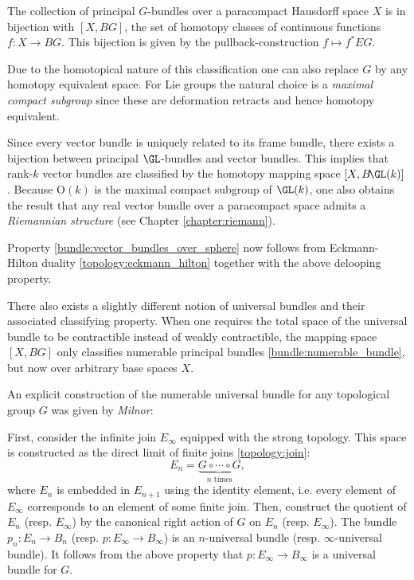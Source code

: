     \begin{property}[Classification]\label{bundle:classification}
        The collection of principal $G$-bundles over a paracompact Hausdorff space $X$ is in bijection with $[X,BG]$, the set of homotopy classes of continuous functions $f:X\rightarrow BG$. This bijection is given by the pullback-construction $f\mapsto f^*EG$.

        Due to the homotopical nature of this classification one can also replace $G$ by any homotopy equivalent space. For Lie groups the natural choice is a \textit{maximal compact subgroup} since these are deformation retracts and hence homotopy equivalent.
    \end{property}
    \begin{result}
        Since every vector bundle is uniquely related to its frame bundle, there exists a bijection between principal $\GL$-bundles and vector bundles. This implies that rank-$k$ vector bundles are classified by the homotopy mapping space $[X,B\!\GL(k)]$. Because $\mathrm{O}(k)$ is the maximal compact subgroup of $\GL(k)$, one also obtains the result that any real vector bundle over a paracompact space admits a \textit{Riemannian structure} (see Chapter \ref{chapter:riemann}).

        Property \ref{bundle:vector_bundles_over_sphere} now follows from Eckmann-Hilton duality \ref{topology:eckmann_hilton} together with the above delooping property.
    \end{result}
    \begin{remark}
        There also exists a slightly different notion of universal bundles and their associated classifying property. When one requires the total space of the universal bundle to be contractible instead of weakly contractible, the mapping space $[X,BG]$ only classifies numerable principal bundles \ref{bundle:numerable_bundle}, but now over arbitrary base spaces $X$.
    \end{remark}

    An explicit construction of the numerable universal bundle for any topological group $G$ was given by \textit{Milnor}:
    \begin{construct}
        First, consider the infinite join $E_\infty$ equipped with the strong topology. This space is constructed as the direct limit of finite joins \ref{topology:join}: \[E_n=\underbrace{G\circ\cdots\circ G}_{n\text{ times}},\] where $E_n$ is embedded in $E_{n+1}$ using the identity element, i.e. every element of $E_\infty$ corresponds to an element of some finite join. Then, construct the quotient of $E_n$ (resp. $E_\infty$) by the canonical right action of $G$ on $E_n$ (resp. $E_\infty$). The bundle $p_n:E_n\rightarrow B_n$ (resp. $p:E_\infty\rightarrow B_\infty$) is an $n$-universal bundle (resp. $\infty$-universal bundle). It follows from the above property that $p:E_\infty\rightarrow B_\infty$ is a universal bundle for $G$.
    \end{construct}

